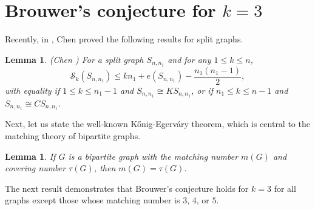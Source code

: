 \documentclass[12pt]{article}
\theoremstyle{plain}
\newtheorem{lemma}[theorem]{Lemma}
\newtheorem{corollary}[theorem]{Corollary}
\theoremstyle{definition}
\begin{document}
% 
\section{Brouwer's conjecture for $k=3$}\label{sec3}
Recently, in \cite{Chen2018a}, Chen proved the following results for split graphs.
\begin{lemma} {\em (Chen \cite{Chen2018a})} \label{splitl} For a split graph $S_{n,n_1}$ and for any $1\leq k\leq n$,
	$$\mathcal{S}_k\left(S_{n, n_1}\right)\leq kn_1+e\left(S_{n,n_1}\right)-\frac{n_1\left(n_1-1\right)}{2},$$
	with equality if $1\leq k\leq n_1-1$ and $S_{n, n_1}\cong KS_{n,n_1}$, or if $n_1\leq k\leq n-1$ and $S_{n, n_1}\cong CS_{n,n_1}$.
\end{lemma}
Next, let us state the well-known Kőnig-Egerváry theorem, which is central to the matching theory of bipartite graphs.

\begin{lemma} \label{mat=tau}
If $G$ is a bipartite graph with the matching number $m(G)$ and covering number $\tau(G)$, then $m(G)=\tau(G)$.
\end{lemma}
The next result demonstrates that Brouwer’s conjecture holds for $k=3$ for all graphs except those whose matching number is $3$, $4$, or $5$.
\end{document}
